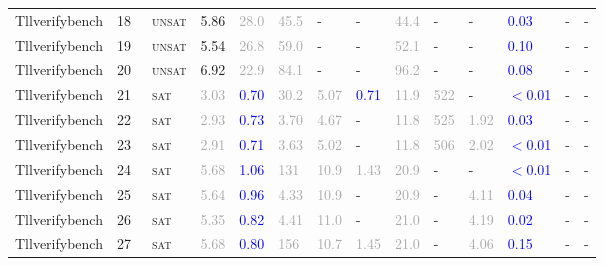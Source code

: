 \begin{center}
{\begin{longtable}{@{}llllllllllllll@{}}
Tllverifybench & 18 & ~\textsc{unsat} & \textcolor{second}{5.86} & \textcolor{darkgray}{28.0} & \textcolor{darkgray}{45.5} & - & - & \textcolor{darkgray}{44.4} & - & - & \textcolor{blue}{0.03} & - & - \\
Tllverifybench & 19 & ~\textsc{unsat} & \textcolor{second}{5.54} & \textcolor{darkgray}{26.8} & \textcolor{darkgray}{59.0} & - & - & \textcolor{darkgray}{52.1} & - & - & \textcolor{blue}{0.10} & - & - \\
Tllverifybench & 20 & ~\textsc{unsat} & \textcolor{second}{6.92} & \textcolor{darkgray}{22.9} & \textcolor{darkgray}{84.1} & - & - & \textcolor{darkgray}{96.2} & - & - & \textcolor{blue}{0.08} & - & - \\
Tllverifybench & 21 & ~\textsc{sat} & \textcolor{darkgray}{3.03} & \textcolor{blue}{0.70} & \textcolor{darkgray}{30.2} & \textcolor{darkgray}{5.07} & \textcolor{blue}{0.71} & \textcolor{darkgray}{11.9} & \textcolor{darkgray}{522} & - & \textcolor{blue}{$<$0.01} & - & - \\
Tllverifybench & 22 & ~\textsc{sat} & \textcolor{darkgray}{2.93} & \textcolor{blue}{0.73} & \textcolor{darkgray}{3.70} & \textcolor{darkgray}{4.67} & - & \textcolor{darkgray}{11.8} & \textcolor{darkgray}{525} & \textcolor{darkgray}{1.92} & \textcolor{blue}{0.03} & - & - \\
Tllverifybench & 23 & ~\textsc{sat} & \textcolor{darkgray}{2.91} & \textcolor{blue}{0.71} & \textcolor{darkgray}{3.63} & \textcolor{darkgray}{5.02} & - & \textcolor{darkgray}{11.8} & \textcolor{darkgray}{506} & \textcolor{darkgray}{2.02} & \textcolor{blue}{$<$0.01} & - & - \\
Tllverifybench & 24 & ~\textsc{sat} & \textcolor{darkgray}{5.68} & \textcolor{blue}{1.06} & \textcolor{darkgray}{131} & \textcolor{darkgray}{10.9} & \textcolor{darkgray}{1.43} & \textcolor{darkgray}{20.9} & - & - & \textcolor{blue}{$<$0.01} & - & - \\
Tllverifybench & 25 & ~\textsc{sat} & \textcolor{darkgray}{5.64} & \textcolor{blue}{0.96} & \textcolor{darkgray}{4.33} & \textcolor{darkgray}{10.9} & - & \textcolor{darkgray}{20.9} & - & \textcolor{darkgray}{4.11} & \textcolor{blue}{0.04} & - & - \\
Tllverifybench & 26 & ~\textsc{sat} & \textcolor{darkgray}{5.35} & \textcolor{blue}{0.82} & \textcolor{darkgray}{4.41} & \textcolor{darkgray}{11.0} & - & \textcolor{darkgray}{21.0} & - & \textcolor{darkgray}{4.19} & \textcolor{blue}{0.02} & - & - \\
Tllverifybench & 27 & ~\textsc{sat} & \textcolor{darkgray}{5.68} & \textcolor{blue}{0.80} & \textcolor{darkgray}{156} & \textcolor{darkgray}{10.7} & \textcolor{darkgray}{1.45} & \textcolor{darkgray}{21.0} & - & \textcolor{darkgray}{4.06} & \textcolor{blue}{0.15} & - & - \\

\end{longtable}}
\end{center}
